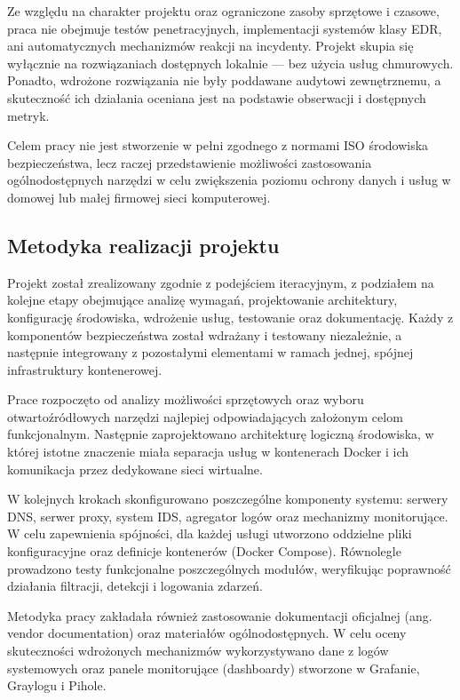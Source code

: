 \documentclass[
    left=2.5cm,         %
    right=2.5cm,        %
    top=2.5cm,          %
    bottom=3cm,         %
    bindingoffset=6mm,  %
    nohyphenation=true %
]{eiti/eiti-thesis} %
\begin{document}
Ze względu na charakter projektu oraz ograniczone zasoby sprzętowe i czasowe, praca nie obejmuje testów penetracyjnych, implementacji systemów klasy EDR, ani automatycznych mechanizmów reakcji na incydenty. Projekt skupia się wyłącznie na rozwiązaniach dostępnych lokalnie — bez użycia usług chmurowych. Ponadto, wdrożone rozwiązania nie były poddawane audytowi zewnętrznemu, a skuteczność ich działania oceniana jest na podstawie obserwacji i dostępnych metryk.

Celem pracy nie jest stworzenie w pełni zgodnego z normami ISO środowiska bezpieczeństwa, lecz raczej przedstawienie możliwości zastosowania ogólnodostępnych narzędzi w celu zwiększenia poziomu ochrony danych i usług w domowej lub małej firmowej sieci komputerowej.

\subsection{Metodyka realizacji projektu}

Projekt został zrealizowany zgodnie z podejściem iteracyjnym, z podziałem na kolejne etapy obejmujące analizę wymagań, projektowanie architektury, konfigurację środowiska, wdrożenie usług, testowanie oraz dokumentację. Każdy z komponentów bezpieczeństwa został wdrażany i testowany niezależnie, a następnie integrowany z pozostałymi elementami w ramach jednej, spójnej infrastruktury kontenerowej.

Prace rozpoczęto od analizy możliwości sprzętowych oraz wyboru otwartoźródłowych narzędzi najlepiej odpowiadających założonym celom funkcjonalnym. Następnie zaprojektowano architekturę logiczną środowiska, w której istotne znaczenie miała separacja usług w kontenerach Docker i ich komunikacja przez dedykowane sieci wirtualne.

W kolejnych krokach skonfigurowano poszczególne komponenty systemu: serwery DNS, serwer proxy, system IDS, agregator logów oraz mechanizmy monitorujące. W celu zapewnienia spójności, dla każdej usługi utworzono oddzielne pliki konfiguracyjne\cite{github-homenetguardian} oraz definicje kontenerów (Docker Compose)\cite{lukaszfd_dockercompose2024}. Równolegle prowadzono testy funkcjonalne poszczególnych modułów, weryfikując poprawność działania filtracji, detekcji i logowania zdarzeń.

Metodyka pracy zakładała również zastosowanie dokumentacji oficjalnej (ang. vendor documentation) oraz materiałów ogólnodostępnych. W celu oceny skuteczności wdrożonych mechanizmów wykorzystywano dane z logów systemowych oraz panele monitorujące (dashboardy) stworzone w Grafanie, Graylogu i Pihole.
\end{document}
